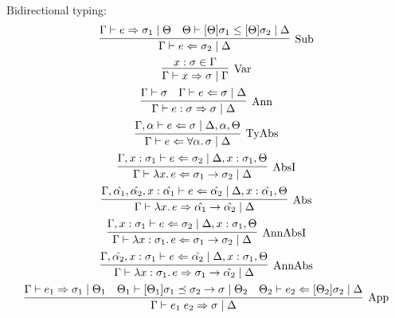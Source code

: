 Bidirectional typing:
\begin{gather*}
  \infer[\text{Sub}]{\Gamma \vdash e \Leftarrow \sigma_2 \mid \Delta}{
    \Gamma \vdash e \Rightarrow \sigma_1 \mid \Theta
    &
    \Theta \vdash [\Theta]\sigma_1 \leq [\Theta]\sigma_2 \mid \Delta
  }
  \\
  \infer[\text{Var}]{\Gamma \vdash x \Rightarrow \sigma \mid \Gamma}{
    x: \sigma \in \Gamma
  }
  \\
  \infer[\text{Ann}]{\Gamma \vdash e: \sigma \Rightarrow \sigma \mid \Delta}{
    \Gamma \vdash \sigma
    &
    \Gamma \vdash e \Leftarrow \sigma \mid \Delta
  }
  \\
  \infer[\text{TyAbs}]{\Gamma \vdash e \Leftarrow \forall \alpha\ldotp \sigma \mid \Delta}{
    \Gamma,\alpha \vdash e \Leftarrow \sigma \mid \Delta, \alpha, \Theta
  }
  \\
  \infer[\text{AbsI}]{\Gamma \vdash \lambda x\ldotp e \Leftarrow \sigma_1 \to \sigma_2 \mid \Delta}{
    \Gamma, x: \sigma_1 \vdash e \Leftarrow \sigma_2 \mid \Delta, x: \sigma_1, \Theta
  }
  \\
  \infer[\text{Abs}]{\Gamma \vdash \lambda x\ldotp e \Rightarrow \hat{\alpha_1} \to \hat{\alpha_2} \mid \Delta}{
    \Gamma, \hat{\alpha_1}, \hat{\alpha_2}, x: \hat{\alpha_1} \vdash e \Leftarrow \hat{\alpha_2} \mid \Delta, x: \hat{\alpha_1}, \Theta
  }
  \\
  \infer[\text{AnnAbsI}]{\Gamma \vdash \lambda x: \sigma_1\ldotp e \Leftarrow \sigma_1 \to \sigma_2 \mid \Delta}{
    \Gamma, x: \sigma_1 \vdash e \Leftarrow \sigma_2 \mid \Delta, x: \sigma_1, \Theta
  }
  \\
  \infer[\text{AnnAbs}]{\Gamma \vdash \lambda x: \sigma_1\ldotp e \Rightarrow \sigma_1 \to \hat{\alpha_2} \mid \Delta}{
    \Gamma, \hat{\alpha_2}, x: \sigma_1 \vdash e \Leftarrow \hat{\alpha_2} \mid \Delta, x: \sigma_1, \Theta
  }
  \\
  \infer[\text{App}]{\Gamma \vdash e_1\; e_2 \Rightarrow \sigma \mid \Delta}{
    \Gamma \vdash e_1 \Rightarrow \sigma_1 \mid \Theta_1
    &
    \Theta_1 \vdash [\Theta_1]\sigma_1 \preceq \sigma_2 \to \sigma \mid \Theta_2
    &
    \Theta_2 \vdash e_2 \Leftarrow [\Theta_2]\sigma_2 \mid \Delta
  }
\end{gather*}

